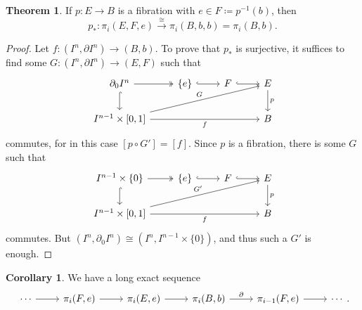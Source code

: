 \documentclass[10pt,letterpaper,cm]{nupset}
\theoremstyle{definition}
\theoremstyle{theorem}
\newtheorem{theorem}[defn]{Theorem}
\newtheorem{corollary}[defn]{Corollary}
\theoremstyle{remark}
\newcommand{\1}{\mathbb{1}}
\newcommand{\0}{\vec 0}
\begin{document}
\begin{theorem}
If $p: E \to B$ is a fibration with $e \in F \coloneqq p^{-1}(b)$, then $$p_{\ast} : \pi_i(E, F, e) \overset{\cong}{\longrightarrow} \pi_i(B, b, b) = \pi_i(B, b).$$
\end{theorem}
\begin{proof}
Let $f: (I^n, \partial{I^n}) \to (B, b)$. To prove that $p_{\ast}$ is surjective, it suffices to find some $G : (I^n, \partial{I^n}) \to (E, F)$ such that 
\[
\begin{tikzcd}
\partial_0{I^n} \arrow[r, two heads] \arrow[d, hook]       & \{e\} \arrow[r, hook] & F \arrow[r, hook] & E \arrow[d, "p"] \\
{I^{n-1} \times [0,1]} \arrow[rrr, "f"'] \arrow[rrru, "G"] &                       &                   & B               
\end{tikzcd}
\] commutes, for in this case $[p \circ G'] = [f]$. Since $p$ is a fibration, there is some $G$ such that
\[
\begin{tikzcd}
I^{n-1} \times \{0\} \arrow[r, two heads] \arrow[d, hook]       & \{e\} \arrow[r, hook] & F \arrow[r, hook] & E \arrow[d, "p"] \\
{I^{n-1} \times [0,1]} \arrow[rrr, "f"'] \arrow[rrru, "G'"] &                       &                   & B               
\end{tikzcd}
\] 
commutes. But $(I^n, \partial_0{I^n}) \cong (I^n, I^{n-1} \times \{0\})$, and thus such a $G'$ is enough. 
\end{proof}

\begin{corollary}\label{exhtpy}
We have a long exact sequence 
\[
\begin{tikzcd}
\cdots \arrow[r] & {\pi_i(F, e)} \arrow[r] & {\pi_i(E, e)} \arrow[r] & {\pi_i(B, b)} \arrow[r, "\partial"] & {\pi_{i-1}(F, e)} \arrow[r] & \cdots
\end{tikzcd}
.\]
\end{corollary}
\end{document}
